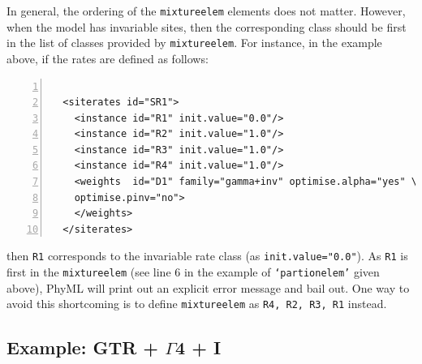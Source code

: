 \documentclass[a4paper,12pt]{article}
\newcommand{\x}[1]{\texttt{#1}}
\begin{document}
In general, the  ordering of the \x{mixtureelem}  elements does not matter. However,  when the model
has invariable sites, then  the corresponding class should be first in  the list of classes provided
by \x{mixtureelem}. For instance, in the example above, if the rates are defined as follows:

\vspace{0.2cm}
\begin{Verbatim}[frame=single, label=Example of `siterates' component, samepage=true,
  baselinestretch=0.5, fontsize=\small, numbers=left]

  <siterates id="SR1">
    <instance id="R1" init.value="0.0"/>
    <instance id="R2" init.value="1.0"/>
    <instance id="R3" init.value="1.0"/>
    <instance id="R4" init.value="1.0"/>
    <weights  id="D1" family="gamma+inv" optimise.alpha="yes" \
    optimise.pinv="no">
    </weights>
  </siterates>
\end{Verbatim}

then \x{R1} corresponds to the invariable  rate class (as \x{init.value="0.0"}).  As \x{R1} is first
in the  \x{mixtureelem} (see line  6 in  the example of  \x{`partionelem'} given above),  PhyML will
print out an  explicit error message and bail out.   One way to avoid this  shortcoming is to define
\x{mixtureelem} as \x{R4, R2, R3, R1} instead.


\subsection{Example: GTR + $\Gamma$4 + I}
\end{document}

